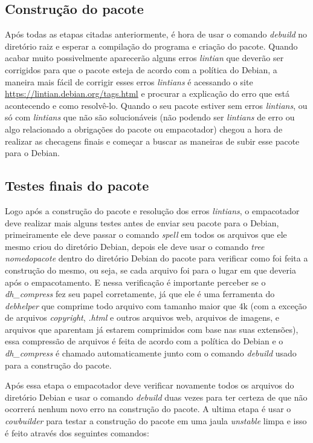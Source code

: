 \subsection{Construção do pacote}

Após todas as etapas citadas anteriormente, é hora de usar o comando \textit{debuild} no diretório raiz e esperar a compilação do programa e criação do pacote. Quando acabar muito possivelmente aparecerão alguns erros \textit{lintian} que deverão ser corrigidos para que o pacote esteja de acordo com a política do Debian, a maneira mais fácil de corrigir esses erros \textit{lintians} é acessando o site \url{https://lintian.debian.org/tags.html} e procurar a explicação do erro que está acontecendo e como resolvê-lo. Quando o seu pacote estiver sem erros \textit{lintians}, ou só com \textit{lintians} que não são solucionáveis (não podendo ser \textit{lintians} de erro ou algo relacionado a obrigações do pacote ou empacotador) chegou a hora de realizar as checagens finais e começar a buscar as maneiras de subir esse pacote para o Debian.

\subsection{Testes finais do pacote}

Logo após a construção do pacote e resolução dos erros \textit{lintians}, o empacotador deve realizar mais alguns testes antes de enviar seu pacote para o Debian, primeiramente ele deve passar o comando \textit{spell} em todos os arquivos que ele mesmo criou do diretório Debian, depois ele deve usar o comando \textit{tree nomedopacote} dentro do diretório Debian do pacote para verificar como foi feita a construção do mesmo, ou seja, se cada arquivo foi para o lugar em que deveria após o empacotamento. E nessa verificação é importante perceber se o \textit{dh\_compress} fez seu papel corretamente, já que ele é uma ferramenta do \textit{debhelper} que comprime todo arquivo com tamanho maior que 4k (com a exceção de arquivos \textit{copyright}, \textit{.html} e outros arquivos web, arquivos de imagens, e arquivos que aparentam já estarem comprimidos com base nas suas extensões), essa compressão de arquivos é feita de acordo com a política do Debian e o \textit{dh\_compress} é chamado automaticamente junto com o comando \textit{debuild} usado para a construção do pacote.

Após essa etapa o empacotador deve verificar novamente todos os arquivos do diretório Debian e usar o comando \textit{debuild} duas vezes para ter certeza de que não ocorrerá nenhum novo erro na construção do pacote. A ultima etapa é usar o \textit{cowbuilder} para testar a construção do pacote em uma jaula \textit{unstable} limpa e isso é feito através dos seguintes comandos:


